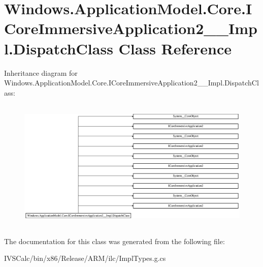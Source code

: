 \hypertarget{class_windows_1_1_application_model_1_1_core_1_1_i_core_immersive_application2_____impl_1_1_dispatch_class}{}\section{Windows.\+Application\+Model.\+Core.\+I\+Core\+Immersive\+Application2\+\_\+\+\_\+\+Impl.\+Dispatch\+Class Class Reference}
\label{class_windows_1_1_application_model_1_1_core_1_1_i_core_immersive_application2_____impl_1_1_dispatch_class}
Inheritance diagram for Windows.\+Application\+Model.\+Core.\+I\+Core\+Immersive\+Application2\+\_\+\+\_\+\+Impl.\+Dispatch\+Class\+:\begin{figure}[H]
\begin{center}
\leavevmode
\includegraphics[height=6.350515cm]{class_windows_1_1_application_model_1_1_core_1_1_i_core_immersive_application2_____impl_1_1_dispatch_class}
\end{center}
\end{figure}


The documentation for this class was generated from the following file\+:\begin{DoxyCompactItemize}
\item 
I\+V\+S\+Calc/bin/x86/\+Release/\+A\+R\+M/ilc/Impl\+Types.\+g.\+cs\end{DoxyCompactItemize}
